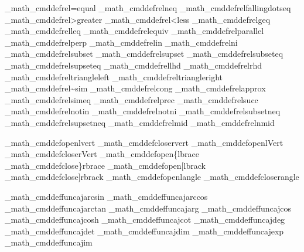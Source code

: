 {\brl@document_math_cmddef{rel}{=}{equal}
\brl@document_math_cmddef{rel}{\neq}{neq}
\brl@document_math_cmddef{rel}{\fallingdotseq}{fallingdotseq}
\brl@document_math_cmddef{rel}{>}{greater}
\brl@document_math_cmddef{rel}{<}{less}
\brl@document_math_cmddef{rel}{\geq}{geq}
\brl@document_math_cmddef{rel}{\leq}{leq}
\brl@document_math_cmddef{rel}{\equiv}{equiv}
\brl@document_math_cmddef{rel}{\parallel}{parallel}
\brl@document_math_cmddef{rel}{\perp}{perp}
\brl@document_math_cmddef{rel}{\in}{in}
\brl@document_math_cmddef{rel}{\ni}{ni}
\brl@document_math_cmddef{rel}{\subset}{subset}
\brl@document_math_cmddef{rel}{\supset}{supset}
\brl@document_math_cmddef{rel}{\supseteq}{subseteq}
\brl@document_math_cmddef{rel}{\supseteq}{supseteq}
\brl@document_math_cmddef{rel}{\lhd}{lhd}
\brl@document_math_cmddef{rel}{\rhd}{rhd}
\brl@document_math_cmddef{rel}{\triangleleft}{triangleleft}
\brl@document_math_cmddef{rel}{\triangleright}{triangleright}
\brl@document_math_cmddef{rel}{\sim}{sim}
\brl@document_math_cmddef{rel}{\cong}{cong}
\brl@document_math_cmddef{rel}{\approx}{approx}
\brl@document_math_cmddef{rel}{\simeq}{simeq}
\brl@document_math_cmddef{rel}{\prec}{prec}
\brl@document_math_cmddef{rel}{\succ}{succ}
\brl@document_math_cmddef{rel}{\notin}{notin}
\brl@document_math_cmddef{rel}{\notni}{notni}
\brl@document_math_cmddef{rel}{\subsetneq}{subsetneq}
\brl@document_math_cmddef{rel}{\supsetneq}{supsetneq}
\brl@document_math_cmddef{rel}{\mid}{mid}
\brl@document_math_cmddef{rel}{\nmid}{nmid}

\brl@document_math_cmddef{open}{\lvert}{lvert}
\brl@document_math_cmddef{close}{\rvert}{rvert}
\brl@document_math_cmddef{open}{\lVert}{lVert}
\brl@document_math_cmddef{close}{\rVert}{rVert}
\brl@document_math_cmddef{open}{\{}{lbrace}
\brl@document_math_cmddef{close}{\}}{rbrace}
\brl@document_math_cmddef{open}{[}{lbrack}
\brl@document_math_cmddef{close}{]}{rbrack}
\brl@document_math_cmddef{open}{\langle}{langle}
\brl@document_math_cmddef{close}{\rangle}{rangle}


\brl@document_math_cmddef{funcaj}{\arcsin}{arcsin}
\brl@document_math_cmddef{funcaj}{\arccos}{arccos}
\brl@document_math_cmddef{funcaj}{\arctan}{arctan}
\brl@document_math_cmddef{funcaj}{\arg}{arg}
\brl@document_math_cmddef{funcaj}{\cos}{cos}
\brl@document_math_cmddef{funcaj}{\cosh}{cosh}
\brl@document_math_cmddef{funcaj}{\cot}{cot}
\brl@document_math_cmddef{funcaj}{\deg}{deg}
\brl@document_math_cmddef{funcaj}{\det}{det}
\brl@document_math_cmddef{funcaj}{\dim}{dim}
\brl@document_math_cmddef{funcaj}{\exp}{exp}
\brl@document_math_cmddef{funcaj}{\im}{im}

}
